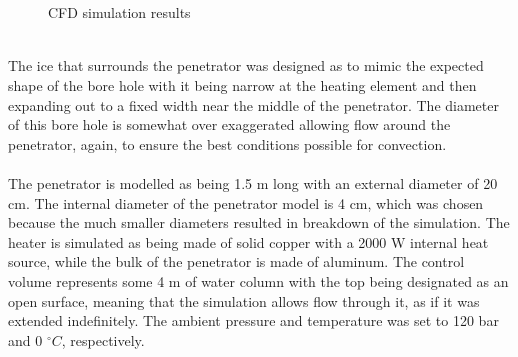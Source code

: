 \begin{figure}[htb]
	\centering
	\\
	\\
	\caption{CFD simulation results}
	\label{fig:cfd}
\end{figure}
\\
The ice that surrounds the penetrator was designed as to mimic the expected shape of the bore hole with it being narrow at the heating element and then expanding out to a fixed width near the middle of the penetrator. The diameter of this bore hole is somewhat over exaggerated allowing flow around the penetrator, again, to ensure the best conditions possible for convection.
\\
\\
The penetrator is modelled as being 1.5 m long with an external diameter of 20 cm. The internal diameter of the penetrator model is 4 cm, which was chosen because the much smaller diameters resulted in breakdown of the simulation. The heater is simulated as being made of solid copper with a 2000 W internal heat source, while the bulk of the penetrator is made of aluminum. The control volume represents some 4 m of water column with the top being designated as an open surface, meaning that the simulation allows flow through it, as if it was extended indefinitely. The ambient pressure and temperature was set to 120 bar and 0 $^\circ C$, respectively.

